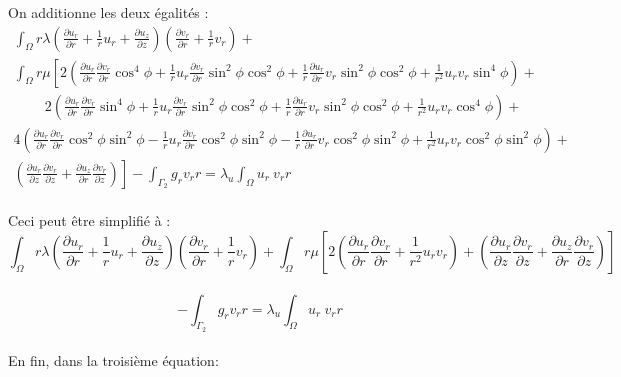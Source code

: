 \documentclass[a4paper,11pt]{article}   %
\begin{document}
On additionne les deux égalités :\\
\begin{eqnarray*} 
\int_{\Omega} r \lambda (\frac{\partial u_r}{\partial r} + \frac{1}{r} u_r + \frac{\partial u_z}{\partial z}) (\frac{\partial v_r}{\partial r} + \frac{1}{r} v_r) +                                    \\
 \int_{\Omega} r \mu \left[ 2 \left(\frac{\partial u_r}{\partial r}\frac{\partial v_r}{\partial r}\cos^4\phi + \frac{1}{r} u_r \frac{\partial v_r}{\partial r}\sin^2 \phi \cos^2 \phi + \frac{1}{r}\frac{\partial u_r}{\partial r} v_r\sin^2 \phi \cos^2 \phi + \frac{1}{r^2} u_r v_r\sin^4\phi\right) +\right.\\ \qquad\ \left.2 \left(\frac{\partial u_r}{\partial r}\frac{\partial v_r}{\partial r}\sin^4\phi + \frac{1}{r} u_r \frac{\partial v_r}{\partial r}\sin^2 \phi \cos^2 \phi + \frac{1}{r}\frac{\partial u_r}{\partial r} v_r\sin^2 \phi \cos^2 \phi + \frac{1}{r^2} u_r v_r\cos^4\phi\right) + \right. \\  \left. 4 \left( \frac{\partial u_r}{\partial r}\frac{\partial v_r}{\partial r}\cos^2\phi\sin^2\phi - \frac{1}{r}u_r\frac{\partial v_r}{\partial r} \cos^2\phi\sin^2\phi - \frac{1}{r} \frac{\partial u_r}{\partial r} v_r \cos^2\phi\sin^2\phi + \frac{1}{r^2}u_r v_r \cos^2\phi\sin^2\phi\right)\right. + \\  \left. \left(\frac{\partial u_r}{\partial z}\frac{\partial v_r}{\partial z} + \frac{\partial u_z}{\partial r}\frac{\partial v_r}{\partial z}\right)\right]  - \int_{\Gamma_2} g_r v_r r= \lambda _u \int_{\Omega}u_r\ v_r r 
\end{eqnarray*} \\
Ceci peut être simplifié à : \\
$$\int_{\Omega} r \lambda (\frac{\partial u_r}{\partial r} + \frac{1}{r} u_r + \frac{\partial u_z}{\partial z}) (\frac{\partial v_r}{\partial r} + \frac{1}{r} v_r) + \int_{\Omega} r \mu \left[ 2 \left(\frac{\partial u_r}{\partial r}\frac{\partial v_r}{\partial r} + \frac{1}{r^2} u_r v_r\right) +  \left(\frac{\partial u_r}{\partial z}\frac{\partial v_r}{\partial z} + \frac{\partial u_z}{\partial r}\frac{\partial v_r}{\partial z}\right)\right]$$ \\
$$ - \int_{\Gamma_2} g_r v_r r =\lambda _u \int_{\Omega}u_r\ v_r r $$ \\
En fin, dans la troisième équation: \\
\end{document}
